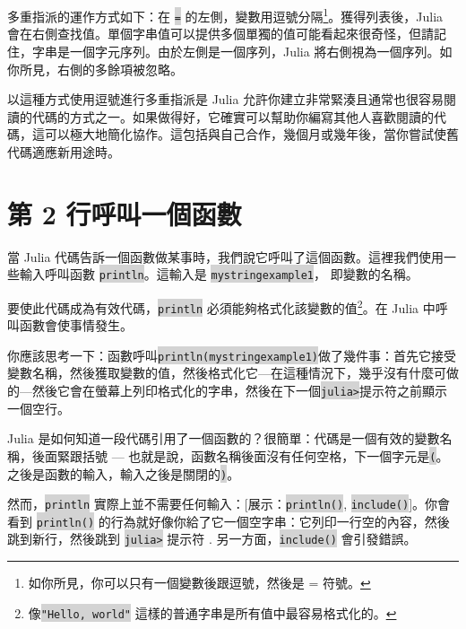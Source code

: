 \documentclass[]{article}
\begin{document}
多重指派的運作方式如下：在 \colorbox{lightgray}{\tt =} 的左側，變數用逗號分隔\footnote{如你所見，你可以只有一個變數後跟逗號，然後是 = 符號。}。獲得列表後，Julia 會在右側查找值。單個字串值可以提供多個單獨的值可能看起來很奇怪，但請記住，字串是一個字元序列。由於左側是一個序列，Julia 將右側視為一個序列。如你所見，右側的多餘項被忽略。

以這種方式使用逗號進行多重指派是 Julia 允許你建立非常緊湊且通常也很容易閱讀的代碼的方式之一。如果做得好，它確實可以幫助你編寫其他人喜歡閱讀的代碼，這可以極大地簡化協作。這包括與自己合作，幾個月或幾年後，當你嘗試使舊代碼適應新用途時。

\hspace*{1.5cm}

\section*{第 2 行呼叫一個函數}

當 Julia 代碼告訴一個函數做某事時，我們說它呼叫了這個函數。這裡我們使用一些輸入呼叫函數 \colorbox{lightgray}{\tt println}。這輸入是 \colorbox{lightgray}{\tt mystringexample1}，
即變數的名稱。

要使此代碼成為有效代碼，\colorbox{lightgray}{\tt println} 必須能夠格式化該變數的值\footnote{像\colorbox{lightgray}{\tt "Hello, world"} 這樣的普通字串是所有值中最容易格式化的。}。在 Julia 中呼叫函數會使事情發生。

你應該思考一下：函數呼叫\colorbox{lightgray}{\tt println(mystringexample1)}做了幾件事：首先它接受變數名稱，然後獲取變數的值，然後格式化它---在這種情況下，幾乎沒有什麼可做的---然後它會在螢幕上列印格式化的字串，然後在下一個\colorbox{lightgray}{\tt julia>}提示符之前顯示一個空行。

Julia 是如何知道一段代碼引用了一個函數的？很簡單：代碼是一個有效的變數名稱，後面緊跟括號 --- 也就是說，函數名稱後面沒有任何空格，下一個字元是\colorbox{lightgray}{\tt(}。之後是函數的輸入，輸入之後是關閉的\colorbox{lightgray}{\tt)}。

然而，\colorbox{lightgray}{\tt println} 實際上並不需要任何輸入：[展示：\colorbox{lightgray}{\tt println()}, \colorbox{lightgray}{\tt include()}]。你會看到 \colorbox{lightgray}{\tt println()} 的行為就好像你給了它一個空字串：它列印一行空的內容，然後跳到新行，然後跳到 \colorbox{lightgray}{\tt julia>} 提示符 . 另一方面，\colorbox{lightgray}{\tt include()} 會引發錯誤。
\end{document}
